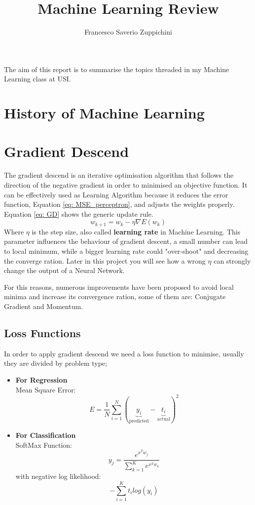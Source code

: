 \documentclass[11pt]{article}
\title{Machine Learning Review}
\author{Francesco Saverio Zuppichini}
\begin{document}
\maketitle
The aim of this report is to summarise the topics threaded in my Machine Learning class at USI.
\section{History of Machine Learning}

\section{Gradient Descend}
The gradient descend is an iterative optimisation algorithm that follows the direction of the negative gradient in order to minimised an objective function. It can be effectively used as Learning Algorithm because it reduces the error function, Equation \ref{eq: MSE_perceptron}, and adjusts the weights properly. Equation \ref{eq: GD} shows the generic update rule.
\begin{equation}
	w_{k + 1} = w_k - \eta \nabla E(w_k)
	\label{eq: gradient_descent}
\end{equation}
Where $\eta$ is the step size, also called \textbf{learning rate} in Machine Learning. This parameter influences the behaviour of gradient descent, a small number can lead to local minimum, while a bigger learning rate could "over-shoot" and decreasing the converge ration. Later in this project you will see how a wrong $\eta$ can strongly change the output of a Neural Network.

For this reasons, numerous improvements have been proposed to avoid local minima and increase its convergence ration, some of them are: Conjugate Gradient and Momentum.
\subsection{Loss Functions}
In order to apply gradient descend we need a loss function to minimise, usually they are divided by problem type;

\begin{itemize}
	\item \textbf{For Regression} \\
	Mean Square Error: \\
	\begin{equation}
	E = \frac{1}{N}\sum_{i=1}^N(\underbrace{y_i}_{\text{predicted}} - \underbrace{t_i}_{\text{actual}})^2
	\label{eq: MSE}	
	\end{equation}
	\item \textbf{For Classification} \\
	SoftMax Function:
	\begin{equation}
	y_j = \frac{e^{x^Tw_j}}{\sum_{k = 1}^K e^{x^Tw_k}}
	\label{eq: soft_max}	
	\end{equation}
	with negative log likelihood:\\
	\begin{equation}
	- \sum_{i = 1}^K t_ilog(y_i)
	\label{eq: log_like}
	\end{equation}
	
\end{itemize}
\end{document}
